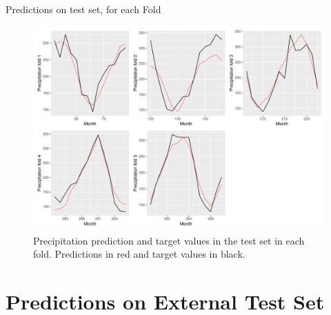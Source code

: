 \documentclass[
  ignorenonframetext,
]{beamer}
\begin{document}
\begin{frame}{Predictions on test set, for each Fold}
\protect\hypertarget{predictions-on-test-set-for-each-fold}{}
\begin{figure}

{\centering \includegraphics[width=0.75\linewidth]{ma-presentation_files/figure-beamer/pred-plot-fold-lasso-stand-1} 

}

\caption{Precipitation prediction and target values in the test set in each fold. Predictions in red and target values in black.}\label{fig:pred-plot-fold-lasso-stand}
\end{figure}
\end{frame}

\hypertarget{predictions-on-external-test-set}{%
\section{Predictions on External Test
Set}\label{predictions-on-external-test-set}}
\end{document}
